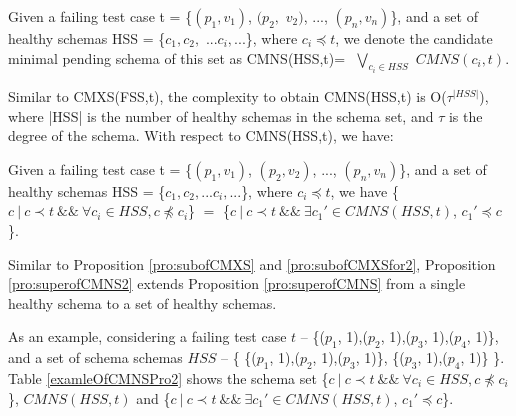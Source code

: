 {\begin{definition}
Given a failing test case t = \{$(p_{1}, v_{1})$, $(p_{2}, $ $v_{2})$, ..., $(p_{n}, v_{n})$\}, and a set of healthy schemas HSS = \{$c_{1} , c_{2},$ $  ...c_{i}, ...$\}, where $ c_{i} \preceq t$, we denote the candidate minimal pending schema of this set as CMNS(HSS,t)= $ $ $\bigvee_{c_{i}\in HSS}$ $ CMNS(c_{i}, t)$.
\end{definition}

Similar to CMXS(FSS,t), the complexity to obtain CMNS(HSS,t) is O($\tau^{|HSS|}$), where |HSS| is the number of healthy schemas in the schema set, and $\tau$ is the degree of the schema. With respect to CMNS(HSS,t), we have:

\begin{proposition}\label{pro:superofCMNS2}
Given a failing test case t = \{$(p_{1}, v_{1})$, $(p_{2}, v_{2})$, ..., $(p_{n}, v_{n})$\}, and a set of healthy schemas HSS = \{$c_{1} , c_{2}, ... c_{i}, ...$\}, where $ c_{i} \preceq t$,  we have \{$c\ |\ c \prec t\ \&\&\ \forall c_{i} \in HSS, c \npreceq c_{i} $\} $=$  \{$ c\ |\ c \prec t \ \&\& \ \exists c_{1}' \in CMNS(HSS, t)$, $c_{1}' \preceq c$\}.
\end{proposition}

Similar to Proposition \ref{pro:subofCMXS} and \ref{pro:subofCMXSfor2},  Proposition \ref{pro:superofCMNS2} extends Proposition \ref{pro:superofCMNS} from a single healthy schema to a set of healthy schemas.

As an example, considering a failing test case $t$ -- \{($p_{1}$, 1),($p_{2}$, 1),($p_{3}$, 1),($p_{4}$, 1)\}, and a set of schema schemas  $HSS$ -- \{ \{($p_{1}$, 1),($p_{2}$, 1),($p_{3}$, 1)\},  \{($p_{3}$, 1),($p_{4}$, 1)\} \}. Table \ref{examleOfCMNSPro2} shows the schema set \{$c\ |\ c \prec t\ \&\&\ \forall c_{i} \in HSS, c \npreceq c_{i} $\}, $CMNS(HSS, t)$ and \{$ c\ |\ c \prec t \ \&\& \ \exists c_{1}' \in CMNS(HSS, t)$, $c_{1}' \preceq c$\}.


}
